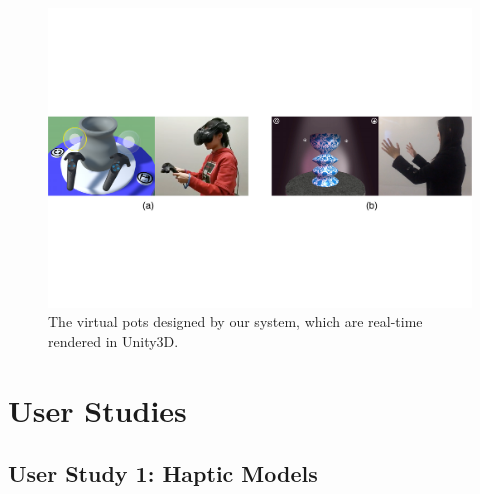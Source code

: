 \documentclass{svjour3}                     %
\begin{document}
\begin{figure}
\includegraphics[width=\textwidth]{fig13}
\caption{The virtual pots designed by our system, which are real-time rendered in Unity3D.}
\label{fig:pots}
\end{figure}










































\section{User Studies}
\label{sec:study}

\subsection{User Study 1: Haptic Models}
\label{sec:study1}
\end{document}
